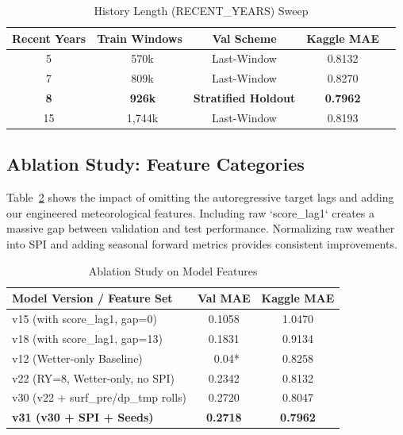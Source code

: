 \documentclass[conference]{IEEEtran}
\begin{document}
\begin{table}[htbp]
\caption{History Length (RECENT\_YEARS) Sweep}
\begin{center}
\begin{tabular}{ccccc}
\toprule
\textbf{Recent Years} & \textbf{Train Windows} & \textbf{Val Scheme} & \textbf{Kaggle MAE} \\
\midrule
5  & ~570k & Last-Window & 0.8132 \\
7  & ~809k & Last-Window & 0.8270 \\
\textbf{8}  & \textbf{~926k} & \textbf{Stratified Holdout} & \textbf{0.7962} \\
15 & ~1,744k & Last-Window & 0.8193 \\
\bottomrule
\end{tabular}
\label{tab:recent_years}
\end{center}
\end{table}

\subsection{Ablation Study: Feature Categories}
Table~\ref{tab:ablation} shows the impact of omitting the autoregressive target lags and adding our engineered meteorological features. Including raw `score\_lag1` creates a massive gap between validation and test performance. Normalizing raw weather into SPI and adding seasonal forward metrics provides consistent improvements.

\begin{table}[htbp]
\caption{Ablation Study on Model Features}
\begin{center}
\begin{tabular}{lcc}
\toprule
\textbf{Model Version / Feature Set} & \textbf{Val MAE} & \textbf{Kaggle MAE} \\
\midrule
v15 (with score\_lag1, gap=0)      & 0.1058 & 1.0470 \\
v18 (with score\_lag1, gap=13)     & 0.1831 & 0.9134 \\
v12 (Wetter-only Baseline)         & ~0.04* & 0.8258 \\
v22 (RY=8, Wetter-only, no SPI)    & 0.2342 & 0.8132 \\
v30 (v22 + surf\_pre/dp\_tmp rolls) & 0.2720 & 0.8047 \\
\textbf{v31 (v30 + SPI + Seeds)}   & \textbf{0.2718} & \textbf{0.7962} \\
\bottomrule
\end{tabular}
\label{tab:ablation}
\end{center}
\end{table}
\end{document}
